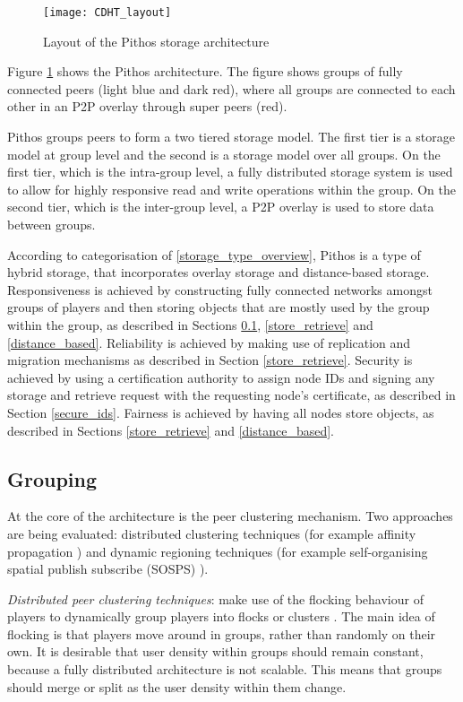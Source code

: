 \begin{figure}[htbp]
 \centering
 \texttt{[image: CDHT\_layout]}
 \caption{Layout of the Pithos storage architecture}
 \label{fig_pithos}
\end{figure}
%
Figure \ref{fig_pithos} shows the Pithos architecture. The figure shows groups of fully connected peers (light blue and dark red), where all groups
are connected to each other in an P2P overlay through super peers (red).

Pithos groups peers to form a two tiered storage model. The first tier is a storage model at group level and the second is a storage model over all
groups. On the first tier, which is the intra-group level, a fully distributed storage system is used to allow for highly responsive read and write
operations within the group. On the second tier, which is the inter-group level, a P2P overlay is used to store data between groups.

According to categorisation of \ref{storage_type_overview}, Pithos is a type of hybrid storage, that incorporates overlay storage and distance-based
storage. Responsiveness is achieved by constructing fully connected networks amongst groups of players and then storing objects that are mostly used
by the group within the group, as described in Sections \ref{grouping}, \ref{store_retrieve} and \ref{distance_based}. Reliability is achieved by
making use of replication and migration mechanisms as described in Section \ref{store_retrieve}. Security is achieved by using a certification
authority to assign node IDs and signing any storage and retrieve request with the requesting node's certificate, as described in Section
\ref{secure_ids}. Fairness is achieved by having all nodes store objects, as described in Sections \ref{store_retrieve} and \ref{distance_based}.

\subsection{Grouping}
\label{grouping}

At the core of the architecture is the peer clustering mechanism. Two approaches are being evaluated: distributed clustering techniques (for example
affinity propagation \cite{affinity_propagation}) and dynamic regioning techniques (for example self-organising spatial publish subscribe (SOSPS)
\cite{self_organising_sps_post}).

\emph{Distributed peer clustering techniques}: make use of the flocking behaviour of players to dynamically group players into flocks or clusters
\cite{flocking}. The main idea of flocking is that players move around in groups, rather than randomly on their own. It is desirable that user
density within groups should remain constant, because a fully distributed architecture is not scalable. This means that groups should merge or split
as the user density within them change.

